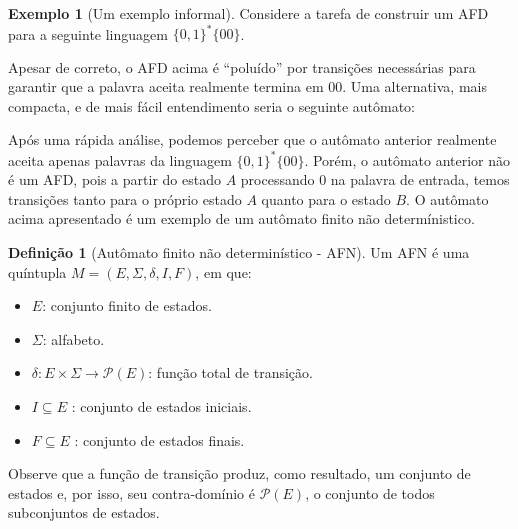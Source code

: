 \documentclass[a4paper]{article}
\theoremstyle{definition}
\newtheorem{Example}{Exemplo}
\newtheorem{Definition}{Definição}
\begin{document}
  \begin{Example}[Um exemplo informal]
    Considere a tarefa de construir um AFD para a seguinte linguagem
    $\{0,1\}^*\{00\}$.
    \begin{figure}[H]
      \centering
    \end{figure}
    Apesar de correto, o AFD acima é ``poluído'' por transições necessárias
    para garantir que a palavra aceita realmente termina em 00. Uma alternativa,
    mais compacta, e de mais fácil entendimento seria o seguinte autômato:
    \begin{figure}[H]
      \centering
    \end{figure}
    Após uma rápida análise, podemos perceber que o autômato anterior realmente
    aceita apenas palavras da linguagem $\{0,1\}^*\{00\}$. Porém, o autômato
    anterior não é um AFD, pois a partir do estado $A$ processando $0$ na
    palavra de entrada, temos transições tanto para o próprio estado $A$ quanto
    para o estado $B$. O autômato acima apresentado é um exemplo de um autômato
    finito não determínistico.
  \end{Example}

  \begin{Definition}[Autômato finito não determinístico - AFN]
    Um AFN é uma quíntupla $M=(E,\Sigma,\delta,I,F)$, em que:
    \begin{itemize}
       \item $E$: conjunto finito de estados.
       \item $\Sigma$: alfabeto.
       \item $\delta : E \times \Sigma \to \mathcal{P}(E)$: função total de transição.
       \item $I \subseteq E$ : conjunto de estados iniciais.
       \item $F \subseteq E$ : conjunto de estados finais.
    \end{itemize}
    Observe que a função de transição produz, como resultado, um conjunto de
    estados e, por isso, seu contra-domínio é $\mathcal{P}(E)$, o conjunto de
    todos subconjuntos de estados.
  \end{Definition}
\end{document}
